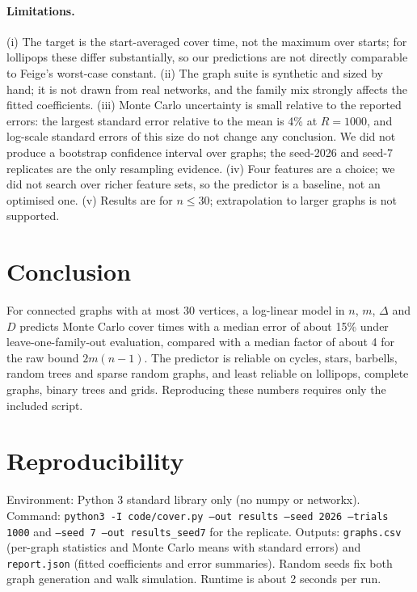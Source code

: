 \documentclass{article}
\begin{document}
\paragraph{Limitations.} (i) The target is the start-averaged cover time, not the maximum over starts; for lollipops these differ substantially, so our predictions are not directly comparable to Feige's worst-case constant. (ii) The graph suite is synthetic and sized by hand; it is not drawn from real networks, and the family mix strongly affects the fitted coefficients. (iii) Monte Carlo uncertainty is small relative to the reported errors: the largest standard error relative to the mean is 4\% at $R=1000$, and log-scale standard errors of this size do not change any conclusion. We did not produce a bootstrap confidence interval over graphs; the seed-2026 and seed-7 replicates are the only resampling evidence. (iv) Four features are a choice; we did not search over richer feature sets, so the predictor is a baseline, not an optimised one. (v) Results are for $n\le 30$; extrapolation to larger graphs is not supported.

\section{Conclusion}
\label{sec:conc}

For connected graphs with at most 30 vertices, a log-linear model in $n$, $m$, $\Delta$ and $D$ predicts Monte Carlo cover times with a median error of about 15\% under leave-one-family-out evaluation, compared with a median factor of about 4 for the raw bound $2m(n-1)$. The predictor is reliable on cycles, stars, barbells, random trees and sparse random graphs, and least reliable on lollipops, complete graphs, binary trees and grids. Reproducing these numbers requires only the included script.

\section*{Reproducibility}
Environment: Python 3 standard library only (no numpy or networkx). Command: \texttt{python3 -I code/cover.py --out results --seed 2026 --trials 1000} and \texttt{--seed 7 --out results\_seed7} for the replicate. Outputs: \texttt{graphs.csv} (per-graph statistics and Monte Carlo means with standard errors) and \texttt{report.json} (fitted coefficients and error summaries). Random seeds fix both graph generation and walk simulation. Runtime is about 2 seconds per run.



\end{document}
